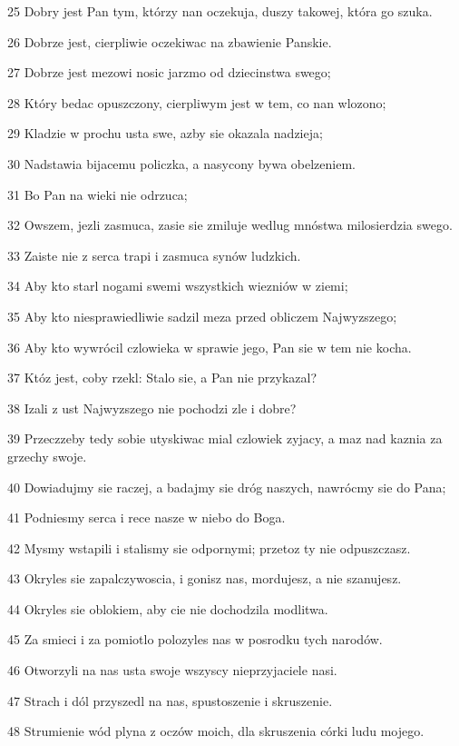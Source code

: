 \par 25 Dobry jest Pan tym, którzy nan oczekuja, duszy takowej, która go szuka.
\par 26 Dobrze jest, cierpliwie oczekiwac na zbawienie Panskie.
\par 27 Dobrze jest mezowi nosic jarzmo od dziecinstwa swego;
\par 28 Który bedac opuszczony, cierpliwym jest w tem, co nan wlozono;
\par 29 Kladzie w prochu usta swe, azby sie okazala nadzieja;
\par 30 Nadstawia bijacemu policzka, a nasycony bywa obelzeniem.
\par 31 Bo Pan na wieki nie odrzuca;
\par 32 Owszem, jezli zasmuca, zasie sie zmiluje wedlug mnóstwa milosierdzia swego.
\par 33 Zaiste nie z serca trapi i zasmuca synów ludzkich.
\par 34 Aby kto starl nogami swemi wszystkich wiezniów w ziemi;
\par 35 Aby kto niesprawiedliwie sadzil meza przed obliczem Najwyzszego;
\par 36 Aby kto wywrócil czlowieka w sprawie jego, Pan sie w tem nie kocha.
\par 37 Któz jest, coby rzekl: Stalo sie, a Pan nie przykazal?
\par 38 Izali z ust Najwyzszego nie pochodzi zle i dobre?
\par 39 Przeczzeby tedy sobie utyskiwac mial czlowiek zyjacy, a maz nad kaznia za grzechy swoje.
\par 40 Dowiadujmy sie raczej, a badajmy sie dróg naszych, nawrócmy sie do Pana;
\par 41 Podniesmy serca i rece nasze w niebo do Boga.
\par 42 Mysmy wstapili i stalismy sie odpornymi; przetoz ty nie odpuszczasz.
\par 43 Okryles sie zapalczywoscia, i gonisz nas, mordujesz, a nie szanujesz.
\par 44 Okryles sie oblokiem, aby cie nie dochodzila modlitwa.
\par 45 Za smieci i za pomiotlo polozyles nas w posrodku tych narodów.
\par 46 Otworzyli na nas usta swoje wszyscy nieprzyjaciele nasi.
\par 47 Strach i dól przyszedl na nas, spustoszenie i skruszenie.
\par 48 Strumienie wód plyna z oczów moich, dla skruszenia córki ludu mojego.

